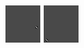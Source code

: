 \begin{figure}[ht]
 \includegraphics[width=\textwidth*11/100]{ch5/figures/firstgabor_Scaling_4.png}
 \includegraphics[width=\textwidth*11/100]{ch5/figures/firstgabor_Scaling_5.png}

\end{figure}
